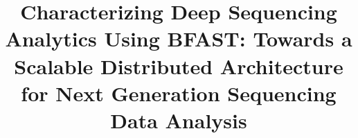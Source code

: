 \documentclass{acm_proc_article-sp}
\begin{document}

\newif\ifdraft
\drafttrue                                                                                                   

\ifdraft
 \newcommand{\rananote}[1]{ {\textcolor{blue}    { ***Omer:     #1 }}}
 \newcommand{\jkimnote}[1]{{\textcolor{green}   { ***Joohyun:   #1 }}}
 \newcommand{\jhanote}[1]{  {\textcolor{red}     { ***SJ: #1 }}}
  \newcommand{\weinote}[1]{  {\textcolor{blue}     { ***Wei: #1 }}}
 \newcommand{\todo}[1]{  {\textcolor{red}     { ***TODO: #1 }}}
 \newcommand{\fix}[1]{  {\textcolor{red}     { ***FIX: #1 }}}

\else
 \newcommand{\rananote}[1]{}
 \newcommand{\jkimnote}[1]{}
 \newcommand{\jhanote}[1]{}
 \newcommand{\todo}[1]{  {\textcolor{red}     { ***TODO: #1 }}}
 \newcommand{\fix}[1]{}                                                                                     
\fi

\title{Characterizing Deep Sequencing Analytics Using BFAST: Towards a
  Scalable Distributed Architecture for Next Generation
  Sequencing Data Analysis}


%
%
%
%
%
\end{document}
